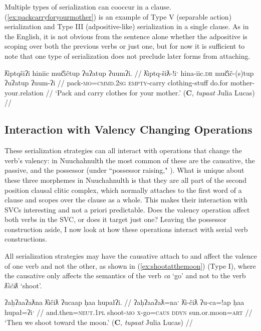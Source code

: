 Multiple types of serialization can cooccur in a clause. (\ref{ex:packcarryforyourmother}) is an example of Type V (separable action) serialization and Type III (adpositive-like) serialization in a single clause. As in the English, it is not obvious from the sentence alone whether the adpositive is scoping over both the previous verbs or just one, but for now it is sufficient to note that one type of serialization does not preclude later forms from attaching.

\ex \label{ex:packcarryforyourmother}
\begingl
\glpreamble ƛ̓iptqšiʔi hiniic muč̓ičtup ʔuʔatup ʔuumʔi. //
\gla ƛ̓iptq-šiƛ-!iˑ hina-iic.\textsc{dr} muč̓ič-(s)tup ʔuʔatup ʔuum-ʔi //
\glb pack-\textsc{mo}=\textsc{cmmd.2sg} \textsc{empty}-carry clothing-stuff do.for mother-your.relation //
\glft `Pack and carry clothes for your mother.' (\textbf{C}, \textit{tupaat} Julia Lucas) //
\endgl
\xe

\subsection{Interaction with Valency Changing Operations}

These serialization strategies can all interact with operations that change the verb's valency: in Nuuchahnulth the most common of these are the causative, the passive, and the possessor (under ``possessor raising," \citealt{braithwaite2003}). What is unique about these three morphemes in Nuuchahnulth is that they are all part of the second position clausal clitic complex, which normally attaches to the first word of a clause and scopes over the clause as a whole. This makes their interaction with SVCs interesting and not a priori predictable. Does the valency operation affect both verbs in the SVC, or does it target just one? Leaving the possessor construction aside, I now look at how these operations interact with serial verb constructions.

All serialization strategies may have the causative attach to and affect the valence of one verb and not the other, as shown in (\ref{ex:shootatthemoon}) (Type I), where the causative only affects the semantics of the verb \textit{ca} `go' and not to the verb \textit{ƛ̓ičiƛ} `shoot'.

\ex \label{ex:shootatthemoon}
\begingl
\glpreamble ʔaḥʔaaʔaƛna ƛ̓ičiƛ ʔucaap ḥaa hupałʔi. //
\gla ʔaḥʔaaʔaƛ=naˑ ƛ̓i-čiƛ ʔu-ca=!ap ḥaa hupał=ʔiˑ //
\glb and.then=\textsc{neut.1pl} shoot-\textsc{mo} \textsc{x}-go=\textsc{caus} \textsc{ddyn} sun.or.moon=\textsc{art} //
\glft `Then we shoot toward the moon.' (\textbf{C}, \textit{tupaat} Julia Lucas) //
\endgl
\xe

